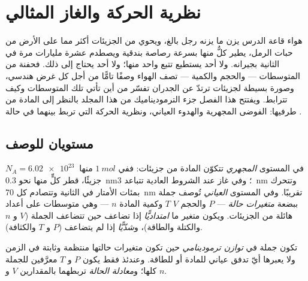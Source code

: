 \chapter{نظرية الحركة والغاز المثالي}\label{ch:b1:kinetic-theory}

هواء قاعة الدرس يزن ما يزنه رجل بالغ، ويحوي من
الجزيئات أكثر مما على الأرض من حبات الرمل، يطير كلٌّ منها بسرعة
رصاصة بندقية ويصطدم عشرة مليارات مرة في الثانية
بجيرانه. ولا أحد يستطيع تتبع واحد منها؛ ولا أحد يحتاج إلى ذلك. فحفنة
من المتوسطات ---   والحجم والكمية --- تصف
الهواء وصفًا تامًّا من أجل كل غرض هندسي، وصورة بسيطة
لجزيئات ترتدّ عن الجدران تفسّر من أين تأتي تلك المتوسطات
وكيف تترابط. ويفتتح هذا الفصل جزء الترموديناميك
من هذا المجلد بالنظر إلى المادة من طرفيها: الفوضى المجهرية
والهدوء العياني، ونظرية الحركة التي تربط بينهما
في حالة .

\section{مستويان للوصف}

\begin{definition}\label{def:b1:kinetic-theory:scales}
في المستوى \emph{المجهري} تتكوّن المادة من جزيئات: ففي $\qty{1}{mol}$
منها $N_A = \qty{6.02e23}{}$ جزيئًا، قطر كلٍّ منها نحو \qty{0.3}{nm}؛
وفي غاز عند الشروط العادية تتباعد \qty{3}{nm} وتتحرك بمئات
الأمتار في الثانية وتتصادم كل \qty{70}{nm} تقريبًا.
وفي المستوى \emph{العياني} تُوصف جملة ببضعة
\emph{متغيرات حالة} ---  $P$ والحجم $V$  $T$
وكمية المادة $n$ --- وهي متوسطات على أعداد هائلة من
الجزيئات. ويكون متغير ما \emph{امتداديًّا} إذا تضاعف حين تتضاعف
الجملة ($V$ و $n$ والكتلة والطاقة)، و\emph{شدّيًّا} إذا لم يتضاعف
($P$ و $T$ والكثافة).
\end{definition}

\begin{definition}\label{def:b1:kinetic-theory:equilibrium}
تكون جملة في \emph{توازن ترمودينامي} حين تكون متغيرات حالتها
منتظمة وثابتة في الزمن ولا يعبرها أيّ تدفق عياني للمادة أو
للطاقة. وعندئذ فقط يكون $P$ و $T$ معرَّفين للجملة
كلها؛ و\emph{معادلة الحالة} تربطهما بالمقدارين $V$ و $n$.
\end{definition}

